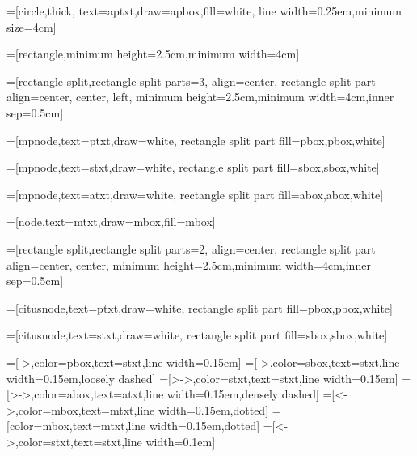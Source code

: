 





=[circle,thick,
	text=aptxt,draw=apbox,fill=white,
	line width=0.25em,minimum size=4cm]

=[rectangle,minimum height=2.5cm,minimum width=4cm]

=[rectangle split,rectangle split parts=3,
	align=center,
	rectangle split part align={center, center, left},
	minimum height=2.5cm,minimum width=4cm,inner sep=0.5cm]

=[mpnode,text=ptxt,draw=white,
  	rectangle split part fill={pbox,pbox,white}]

=[mpnode,text=stxt,draw=white,
	rectangle split part fill={sbox,sbox,white}]

=[mpnode,text=atxt,draw=white,
	rectangle split part fill={abox,abox,white}]

=[node,text=mtxt,draw=mbox,fill=mbox]

=[rectangle split,rectangle split parts=2,
	align=center,
	rectangle split part align={center, center},
	minimum height=2.5cm,minimum width=4cm,inner sep=0.5cm]

=[citusnode,text=ptxt,draw=white,
  	rectangle split part fill={pbox,pbox,white}]

=[citusnode,text=stxt,draw=white,
	rectangle split part fill={sbox,sbox,white}]

=[->,color=pbox,text=stxt,line width=0.15em]
=[->,color=sbox,text=stxt,line width=0.15em,loosely dashed]
=[>->,color=stxt,text=stxt,line width=0.15em]
=[>->,color=abox,text=atxt,line width=0.15em,densely dashed]
=[<->,color=mbox,text=mtxt,line width=0.15em,dotted]
=[color=mbox,text=mtxt,line width=0.15em,dotted]
=[<->,color=stxt,text=stxt,line width=0.1em]
